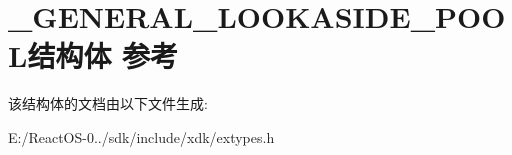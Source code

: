 \hypertarget{struct___g_e_n_e_r_a_l___l_o_o_k_a_s_i_d_e___p_o_o_l}{}\section{\+\_\+\+G\+E\+N\+E\+R\+A\+L\+\_\+\+L\+O\+O\+K\+A\+S\+I\+D\+E\+\_\+\+P\+O\+O\+L结构体 参考}
\label{struct___g_e_n_e_r_a_l___l_o_o_k_a_s_i_d_e___p_o_o_l}


该结构体的文档由以下文件生成\+:\begin{DoxyCompactItemize}
\item 
E\+:/\+React\+O\+S-\/0../sdk/include/xdk/extypes.\+h\end{DoxyCompactItemize}
